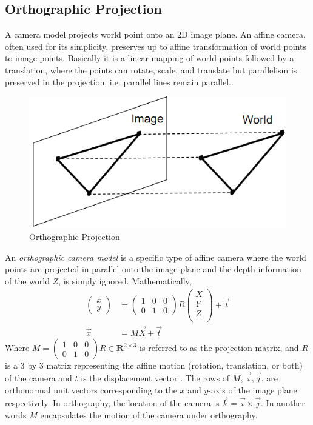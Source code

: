 \subsection{Orthographic Projection}
\label{sec:ortho}
A camera model projects world point onto an 2D image plane. An affine camera, often used for
its simplicity, preserves up to affine transformation of world points
to image points. Basically it is a linear mapping of world points followed by a translation, where
the points can rotate, scale, and translate but parallelism is
preserved in the projection, i.e. parallel lines remain parallel.\cite[p.38]{Szelski}. 
\begin{figure}[!ht]
  \begin{center}
  \includegraphics[scale=0.6]{ortho.png}
  \caption{Orthographic Projection} 
  \label{figures:ortho}
  \end{center}
\end{figure}
An \emph{orthographic
camera model} is a specific type of affine camera where the world
points are projected in parallel onto the image plane and the depth
information of the world $Z$, is simply ignored. Mathematically, 
\begin{align*}
\begin{pmatrix}
  x\\y
\end{pmatrix} &= \begin{pmatrix}
  1& 0&0 \\0 & 1 & 0
\end{pmatrix}
R
\begin{pmatrix}
  X\\Y\\Z\\
\end{pmatrix} + \vec t\\
\vec x &= M\vec X + \vec t
\end{align*}
Where $M = \begin{pmatrix}
  1& 0&0 \\0 & 1 & 0
\end{pmatrix}R \in \mathbf{R}^{2\times 3}$ is referred to as the projection matrix, and $R$
is a 3 by 3 matrix representing the affine motion (rotation, translation, or
both) of the camera and $t$ is the displacement vector
\cite[p.172]{AZ}. The rows of $M$, $\vec i, \vec j$, are orthonormal unit vectors
corresponding to the $x$ and $y$-axis of the image plane respectively. In
orthography, the location of the camera is $\vec k = \vec i \times
\vec j$. In another words $M$ encapsulates the motion of the
camera under orthography. 

